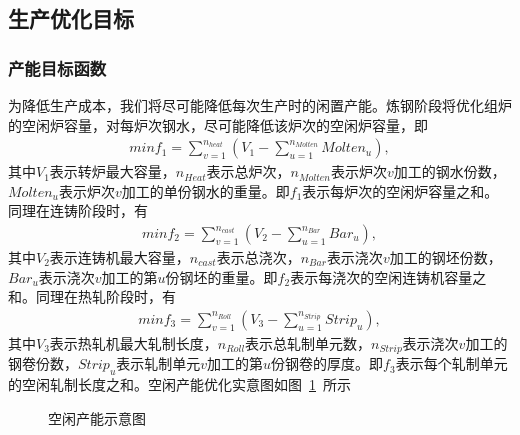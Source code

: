 \documentclass{whutmod}
\begin{document}
		\subsection{生产优化目标}
		\subsubsection{产能目标函数}
		为降低生产成本，我们将尽可能降低每次生产时的闲置产能。炼钢阶段将优化组炉的空闲炉容量，对每炉次钢水，尽可能降低该炉次的空闲炉容量，即
		\begin{gather}
	    min	f_1=\sum_{v=1}^{n_{heat}}( V_1-\sum_{u=1}^{n_{Molten}} Molten_u),
		\end{gather}
		其中$V_1$表示转炉最大容量，$n_{Heat}$表示总炉次，$n_{Molten}$表示炉次$v$加工的钢水份数，$Molten_u$表示炉次$v$加工的单份钢水的重量。即$f_1$表示每炉次的空闲炉容量之和。同理在连铸阶段时，有
		\begin{gather}
		min	f_2=\sum_{v=1}^{n_{cast}}( V_2-\sum_{u=1}^{n_{Bar}} Bar_u),
		\end{gather}
		其中$V_2$表示连铸机最大容量，$n_{cast}$表示总浇次，$n_{Bar}$表示浇次$v$加工的钢坯份数，$Bar_u$表示浇次$v$加工的第$u$份钢坯的重量。即$f_2$表示每浇次的空闲连铸机容量之和。同理在热轧阶段时，有
		\begin{gather}
		min	f_3=\sum_{v=1}^{n_{Roll}}( V_3-\sum_{u=1}^{n_{Strip}} Strip_u),
		\end{gather}
		其中$V_3$表示热轧机最大轧制长度，$n_{Roll}$表示总轧制单元数，$n_{Strip}$表示浇次$v$加工的钢卷份数，$Strip_u$表示轧制单元$v$加工的第$u$份钢卷的厚度。即$f_3$表示每个轧制单元的空闲轧制长度之和。空闲产能优化实意图如图~\ref{xdffdx}~所示
		\begin{figure}[H]
			\centering
			\caption{空闲产能示意图}\label{xdffdx}
		\end{figure}
\end{document}
